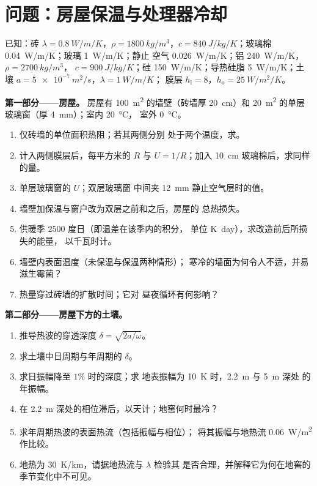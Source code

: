 \section{问题：房屋保温与处理器冷却}

\begin{problem}\label{pb:b2:heat-conduction:1}
已知：砖 $\lambda = \qty{0.8}{W/m/K}$，$\rho = \qty{1800}{kg/m^3}$，$c =
\qty{840}{J/kg/K}$；玻璃棉 \qty{0.04}{W/m/K}；玻璃 \qty{1}{W/m/K}；静止
空气 \qty{0.026}{W/m/K}；铝 \qty{240}{W/m/K}，$\rho = \qty{2700}{kg/m^3}$，
$c = \qty{900}{J/kg/K}$；硅 \qty{150}{W/m/K}；导热硅脂
\qty{5}{W/m/K}；土壤 $a = \qty{5e-7}{m^2/s}$，$\lambda = \qty{1}{W/m/K}$；
膜层 $h_{\text{i}} = 8$，$h_{\text{o}} = \qty{25}{W/m^2/K}$。

\textbf{第一部分——房屋。}
房屋有 \qty{100}{m^2} 的墙壁（砖墙厚 \qty{20}{cm}）和 \qty{20}{m^2}
的单层玻璃窗（厚 \qty{4}{mm}）；室内 \qty{20}{\celsius}，
室外 \qty{0}{\celsius}。
\begin{enumerate}
  \item 仅砖墙的单位面积热阻；若其两侧分别
        处于两个温度，求。
  \item 计入两侧膜层后，每平方米的 $R$ 与 $U = 1/R$；加入
        \qty{10}{cm} 玻璃棉后，求同样的量。
  \item 单层玻璃窗的 $U$；双层玻璃窗
        中间夹 \qty{12}{mm} 静止空气层时的值。
  \item 墙壁加保温与窗户改为双层之前和之后，房屋的
        总热损失。
  \item 供暖季 $2500$ 度日（即温差在该季内的积分，
        单位 \unit{K.day}），求改造前后所损失的能量，
        以千瓦时计。
  \item 墙壁内表面温度（未保温与保温两种情形）；
        寒冷的墙面为何令人不适，并易滋生霉菌？
  \item 热量穿过砖墙的扩散时间；它对
        昼夜循环有何影响？
\end{enumerate}

\textbf{第二部分——房屋下方的土壤。}
\begin{enumerate}[resume]
  \item 推导热波的穿透深度
        $\delta = \sqrt{2a/\omega}$。
  \item 求土壤中日周期与年周期的 $\delta$。
  \item 求日振幅降至 $1\%$ 时的深度；求
        地表振幅为 \qty{10}{K} 时，\qty{2.2}{m} 与 \qty{5}{m} 深处
        的年振幅。
  \item 在 \qty{2.2}{m} 深处的相位滞后，以天计；地窖何时最冷？
  \item 求年周期热波的表面热流（包括振幅与相位）；
        将其振幅与地热流 \qty{0.06}{W/m^2} 作比较。
  \item 地热为 \qty{30}{K/km}，请据地热流与 $\lambda$ 检验其
        是否合理，并解释它为何在地窖的
        季节变化中不可见。
\end{enumerate}


\end{problem}
